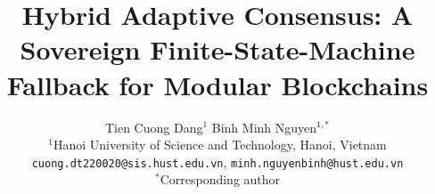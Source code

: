 \title{\Large\bfseries Hybrid Adaptive Consensus: A Sovereign
Finite-State-Machine Fallback for Modular Blockchains}

\author{Tien Cuong Dang$^{1}$ \quad Binh Minh Nguyen$^{1,*}$\\[4pt]
\normalsize $^{1}$Hanoi University of Science and Technology, Hanoi, Vietnam\\
\normalsize \texttt{cuong.dt220020@sis.hust.edu.vn}, \texttt{minh.nguyenbinh@hust.edu.vn}\\
\normalsize $^{*}$Corresponding author}
\date{}

\newcommand{\paperkeywords}{blockchain consensus, Byzantine fault tolerance, modular blockchain, finite state machine, formal verification, TLA+, zero-knowledge proofs}

